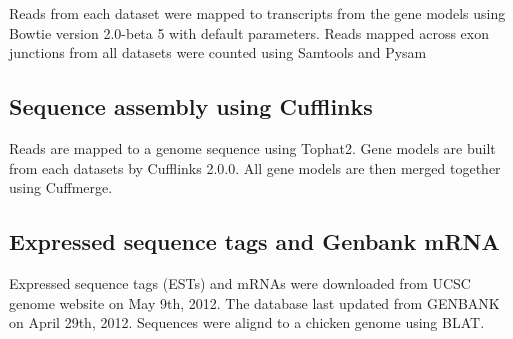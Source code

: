 \documentclass[10pt]{article}
\begin{document}
Reads from each dataset were mapped to transcripts from the gene models using Bowtie version 2.0-beta 5 with default parameters.
Reads mapped across exon junctions from all datasets were counted using Samtools\cite{Li:2009vz} and
Pysam\cite{pysam}

\subsection*{Sequence assembly using Cufflinks}
Reads are mapped to a genome sequence using Tophat2.
Gene models are built from each datasets by Cufflinks 2.0.0\cite{Trapnell:2010kd}.
All gene models are then merged together using Cuffmerge.

\subsection*{Expressed sequence tags and Genbank mRNA}
Expressed sequence tags (ESTs) and mRNAs were downloaded from UCSC genome website on May 9th, 2012.
The database last updated from GENBANK on April 29th, 2012.
Sequences were alignd to a chicken genome using BLAT.


\end{document}
